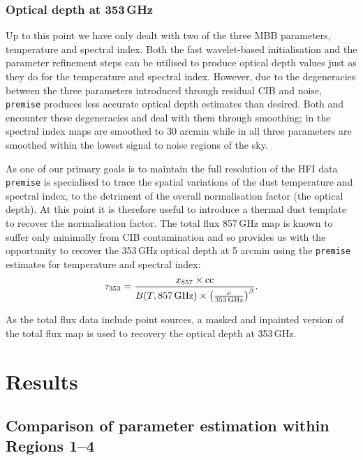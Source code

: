 \documentclass[a4paper,fleqn,usenatbib]{mnras}
\begin{document}
\subsubsection{Optical depth at 353\,GHz}

Up to this point we have only dealt with two of the three MBB parameters, temperature and spectral index. Both the fast wavelet-based initialisation and the parameter refinement steps can be utilised to produce optical depth values just as they do for the temperature and spectral index. However, due to the degeneracies between the three parameters introduced through residual CIB and noise, {\texttt{premise}} produces less accurate optical depth estimates than desired. Both \citet{pr2} and \citet{gnilc} encounter these degeneracies and deal with them through smoothing; in \citet{pr2} the spectral index maps are smoothed to 30 arcmin while in \citet{gnilc} all three parameters are smoothed within the lowest signal to noise regions of the sky. 

As one of our primary goals is to maintain the full resolution of the HFI data {\texttt{premise}} is specialised to trace the spatial variations of the dust temperature and spectral index, to the detriment of the overall normalisation factor (the optical depth). At this point it is therefore useful to introduce a thermal dust template to recover the normalisation factor. The total flux 857\,GHz map is known to suffer only minimally from CIB contamination and so provides us with the opportunity to recover the 353\,GHz optical depth at 5 arcmin using the {\texttt{premise}} estimates for temperature and spectral index: 
\begin{eqnarray}
\tau_{353} = \frac{x_{857} \times \rm{cc}}{B(T,  857\,\rm{GHz}) \times \left(\frac{\nu}{353 \, \rm{GHz}}\right)^{\beta} }.
\end{eqnarray}

As the total flux data include point sources, a masked and inpainted \citep{inpaint} version of the total flux map is used to recovery the optical depth at 353\,GHz. 

\section{Results}
\label{sec:results}

\subsection{Comparison of parameter estimation within Regions 1--4}
\end{document}
